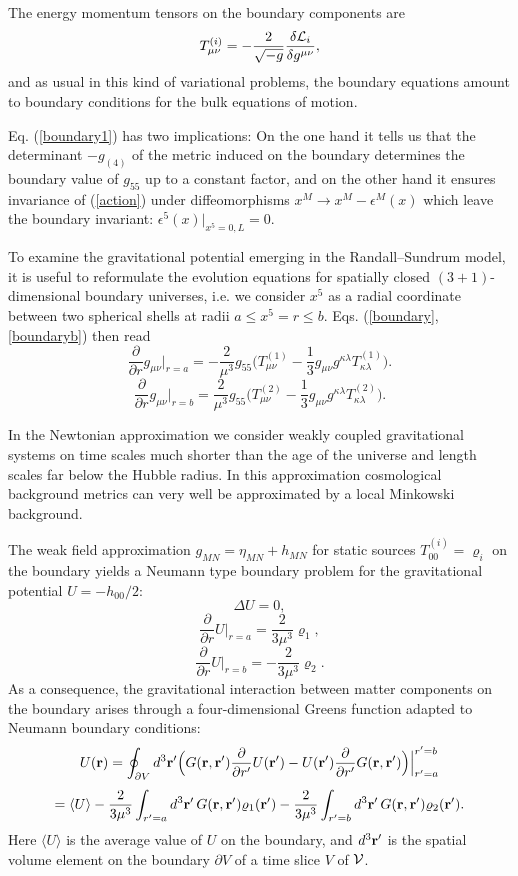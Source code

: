 \documentclass[12pt,fleqn]{article}
\newcommand{\vek}[1]{\mbox{\bf #1}}
\newcommand{\be}{\begin{equation}}
\newcommand{\ee}{\end{equation}}
\begin{document}
The energy momentum tensors on the boundary components are
\[
T_{\mu\nu}^{(i)}=-\frac{2}{\sqrt{-g}}\frac{\delta{\cal L}_i}{\delta g^{\mu\nu}},
\]
and as usual in this kind of variational problems, the boundary equations
amount to boundary conditions for the bulk equations of motion.

Eq. (\ref{boundary1}) has two
implications: On the one hand it tells
us that the determinant $-g_{(4)}$ 
 of the metric induced on the boundary
determines the boundary value of $g_{55}$
up to a constant factor, and on the other
hand it ensures invariance of (\ref{action}) under diffeomorphisms
$x^M\to x^M-\epsilon^M(x)$ which leave the boundary invariant:
 $\epsilon^5(x)|_{x^5=0,L}=0$.

To examine the gravitational potential emerging in the
Randall--Sundrum model,
it is useful to reformulate the evolution equations for spatially closed
 $(3+1)$-dimensional boundary universes, i.e. we consider $x^5$ as
a radial coordinate between two spherical shells at radii
 $a\le x^5=r\le b$. Eqs. (\ref{boundary},\ref{boundaryb}) then read
\be\label{boundaryra}
\frac{\partial}{\partial r} g_{\mu\nu}\Big|_{r=a}
=-\frac{2}{\mu^3}g_{55}\Big(T_{\mu\nu}^{(1)}
-\frac{1}{3}g_{\mu\nu}g^{\kappa\lambda}T_{\kappa\lambda}^{(1)}\Big).
\ee
\be\label{boundaryrb}
\frac{\partial}{\partial r} g_{\mu\nu}\Big|_{r=b}
=\frac{2}{\mu^3}g_{55}\Big(T_{\mu\nu}^{(2)}
-\frac{1}{3}g_{\mu\nu}g^{\kappa\lambda}T_{\kappa\lambda}^{(2)}\Big).
\ee

In the Newtonian approximation we consider weakly coupled
 gravitational systems
on time scales much shorter than
the age of the universe and length scales far below the
Hubble radius. In this approximation cosmological
background metrics can very well be approximated by
a local Minkowski background.

The weak field 
approximation $g_{MN}=\eta_{MN}+h_{MN}$ for static
sources $T_{00}^{(i)}=\varrho_i$
on the boundary yields a Neumann type
boundary problem for the gravitational potential $U=-h_{00}/2$:
\be\label{einsteinU}
\Delta U=0,
\ee
\be\label{boundaryUa}
\frac{\partial}{\partial r} U\Big|_{r=a}=\frac{2}{3\mu^3}\varrho_1,
\ee
\be\label{boundaryUb}
\frac{\partial}{\partial r} U\Big|_{r=b}=-\frac{2}{3\mu^3}\varrho_2.
\ee
As a consequence, the gravitational interaction between
matter components on the boundary 
arises through a four-dimensional Greens function
adapted to Neumann boundary conditions:
\be\label{greenU}
U(\vek{r})=\oint_{\partial V} d^3\vek{r}'\Big(G(\vek{r},\vek{r}')
\frac{\partial}{\partial r'} U(\vek{r}')
-U(\vek{r}')
\frac{\partial}{\partial r'} G(\vek{r},\vek{r}')\Big)\Big|_{r'=a}^{r'=b}
\ee
\[
=\langle U\rangle-\frac{2}{3\mu^3}
\int_{r'=a} d^3\vek{r}'
\,G(\vek{r},\vek{r}')\varrho_1(\vek{r}')
-\frac{2}{3\mu^3}
\int_{r'=b} d^3\vek{r}'
\,G(\vek{r},\vek{r}')\varrho_2(\vek{r}').
\]
Here $\langle U\rangle$ is the average value of $U$
on the boundary,  and $d^3\vek{r}'$ is 
the spatial volume element on 
the boundary $\partial V$ of a time slice $V$ of ${\cal V}$.
\end{document}
